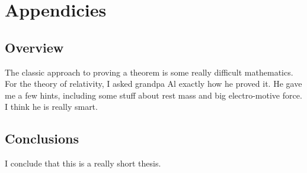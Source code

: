 \chapter{Appendicies}
\section{\label{section:overview}Overview}
   The classic approach to proving a theorem is some really difficult 
   mathematics.  For the theory of relativity, I asked grandpa Al exactly 
   how he proved it.  He gave me a few hints, including some stuff about
   rest mass and big electro-motive force.  I think he is really smart.
\section{Conclusions}
   I conclude that this is a really short thesis.